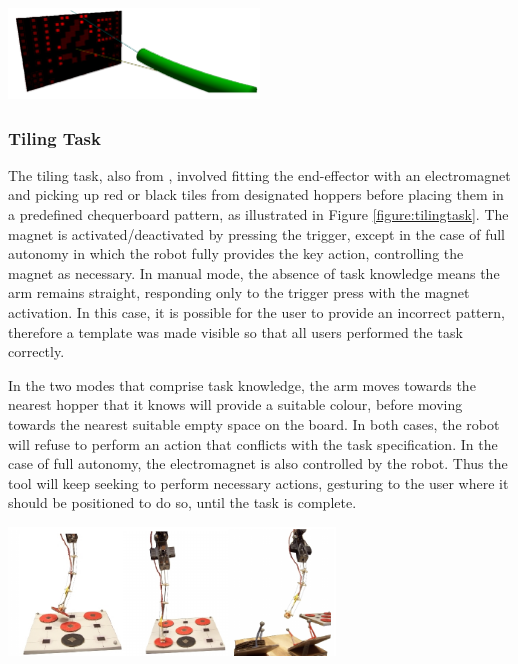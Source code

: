 \documentclass[11pt]{article}
\begin{document}
\begin{center}
\includegraphics[width=0.5\textwidth]{painting.png}
\label{figure:painting}
\end{center}

\subsubsection{Tiling Task}
The tiling task, also from \cite{GreggSmithDesign}, involved fitting the end-effector with an electromagnet and picking up red or black tiles from designated hoppers before placing them in a predefined chequerboard pattern, as illustrated in Figure \ref{figure:tilingtask}. The magnet is activated/deactivated by pressing the trigger, except in the case of full autonomy in which the robot fully provides the key action, controlling the magnet as necessary. In manual mode, the absence of task knowledge means the arm remains straight, responding only to the trigger press with the magnet activation. In this case, it is possible for the user to provide an incorrect pattern, therefore a template was made visible so that all users performed the task correctly. 

In the two modes that comprise task knowledge, the arm moves towards the nearest hopper that it knows will provide a suitable colour, before moving towards the nearest suitable empty space on the board. In both cases, the robot will refuse to perform an action that conflicts with the task specification. In the case of full autonomy, the electromagnet is also controlled by the robot. Thus the tool will keep seeking to perform necessary actions, gesturing to the user where it should be positioned to do so, until the task is complete.

\begin{center}
\includegraphics[width=0.65\textwidth]{tilingtask.png}
\label{figure:tilingtask}
\end{center}
\end{document}
